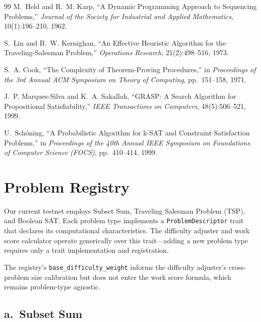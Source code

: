 \documentclass[12pt,letterpaper]{article}
\begin{document}
\begin{thebibliography}{99}
M.~Held and R.~M. Karp, ``A Dynamic Programming Approach to Sequencing Problems,''
\textit{Journal of the Society for Industrial and Applied Mathematics}, 10(1):196--210, 1962.

S.~Lin and B.~W. Kernighan, ``An Effective Heuristic Algorithm for the Traveling-Salesman Problem,''
\textit{Operations Research}, 21(2):498--516, 1973.

S.~A. Cook, ``The Complexity of Theorem-Proving Procedures,'' in \textit{Proceedings of the 3rd
Annual ACM Symposium on Theory of Computing}, pp.~151--158, 1971.

J.~P. Marques-Silva and K.~A. Sakallah, ``GRASP: A Search Algorithm for Propositional
Satisfiability,'' \textit{IEEE Transactions on Computers}, 48(5):506--521, 1999.

U.~Sch\"{o}ning, ``A Probabilistic Algorithm for k-SAT and Constraint Satisfaction Problems,'' in
\textit{Proceedings of the 40th Annual IEEE Symposium on Foundations of Computer Science (FOCS)},
pp.~410--414, 1999.

\end{thebibliography}

\appendix

\renewcommand{\thesection}{\Alph{section}}

\section{Problem Registry}

Our current testnet employs Subset Sum, Traveling Salesman Problem (TSP), and Boolean SAT. Each
problem type implements a \texttt{ProblemDescriptor} trait that declares its computational
characteristics. The difficulty adjuster and work score calculator operate generically over this
trait---adding a new problem type requires only a trait implementation and registration.

The registry's \texttt{base\_difficulty\_weight} informs the difficulty adjuster's cross-problem size
calibration but does not enter the work score formula, which remains problem-type agnostic.

\subsection*{a.\ Subset Sum}
\end{document}
